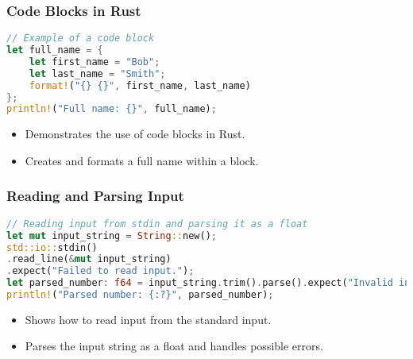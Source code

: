 \documentclass[aspectratio=169, table]{beamer}
\begin{document}
\begin{frame}[fragile]
\frametitle{Code Blocks in Rust}
\begin{lstlisting}[language=Rust]
// Example of a code block
let full_name = {
	let first_name = "Bob";
	let last_name = "Smith";
	format!("{} {}", first_name, last_name)
};
println!("Full name: {}", full_name);
\end{lstlisting}
\begin{itemize}
\item Demonstrates the use of code blocks in Rust.
\item Creates and formats a full name within a block.
\end{itemize}
\end{frame}

\begin{frame}[fragile]
\frametitle{Reading and Parsing Input}
\begin{lstlisting}[language=Rust]
// Reading input from stdin and parsing it as a float
let mut input_string = String::new();
std::io::stdin()
.read_line(&mut input_string)
.expect("Failed to read input.");
let parsed_number: f64 = input_string.trim().parse().expect("Invalid input");
println!("Parsed number: {:?}", parsed_number);
\end{lstlisting}
\begin{itemize}
\item Shows how to read input from the standard input.
\item Parses the input string as a float and handles possible errors.
\end{itemize}
\end{frame}
\end{document}
